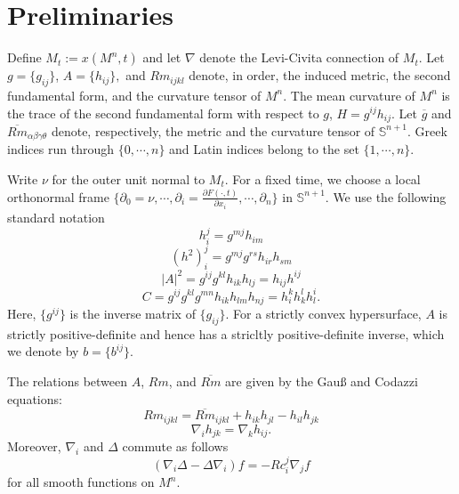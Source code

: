 \documentclass{amsart}
\theoremstyle{definition}
\theoremstyle{remark}
\numberwithin{equation}{section}
\begin{document}
\section{Preliminaries}

Define \(M_t := x(M^n,t)\) and let $\nabla$ denote the Levi-Civita connection of $M_t$. Let $g = \{g_{ij}\}$, $A = \{h_{ij}\},$ and $Rm_{ijkl}$ denote, in order, the induced metric, the second fundamental form, and the curvature tensor of $M^n$. The mean curvature of $M^n$ is the trace of the second fundamental form with respect to $g$, $H = g^{ij}h_{ij}$. Let $\overline{g}$ and $\overline{Rm}_{\alpha\beta\gamma\theta}$ denote, respectively, the metric and the curvature tensor of $\mathbb{S}^{n+1}$. Greek indices run through $\{0,\cdots,n\}$ and Latin indices belong to the set $\{1,\cdots,n\}.$

Write $\nu$ for the outer unit normal to $M_t.$ For a fixed time, we choose a local orthonormal frame $\{\partial_0=\nu, \cdots, \partial_i=\frac{\partial F(\cdot,t)}{\partial x_i}, \cdots, \partial_n\}$ in $\mathbb{S}^{n+1}.$ We use the following standard notation
\[
h_i^j = g^{mj}h_{im}
\]
\[
(h^2)_i^j = g^{mj}g^{rs}h_{ir}h_{sm}
\]
\[
|A|^2 = g^{ij}g^{kl}h_{ik}h_{lj} = h_{ij}h^{ij}
\]
\[
C = g^{ij}g^{kl}g^{mn}h_{ik}h_{lm}h_{nj} = h_i^kh_k^lh_l^i.
\]
Here, $\{g^{ij}\}$ is the inverse matrix of $\{g_{ij}\}.$ For a strictly convex hypersurface, \(A\) is strictly positive-definite and hence has a stricltly positive-definite inverse, which we denote by \(b = \{b^{ij}\}\).

The relations between $A$, $Rm$, and $\overline{Rm}$ are given by the Gau{\ss} and Codazzi equations:
\[
Rm_{ijkl} =\overline{Rm}_{ijkl} +h_{ik}h_{jl} - h_{il}h_{jk}
\]
\[
\nabla_ih_{jk} = \nabla_{k}h_{ij}.
\]
Moreover, $\nabla_i$ and $\Delta$ commute as follows
\[
(\nabla_i\Delta - \Delta\nabla_i)f = -Rc_i^j \nabla_j f
\]
for all smooth functions on $M^n.$
\end{document}
